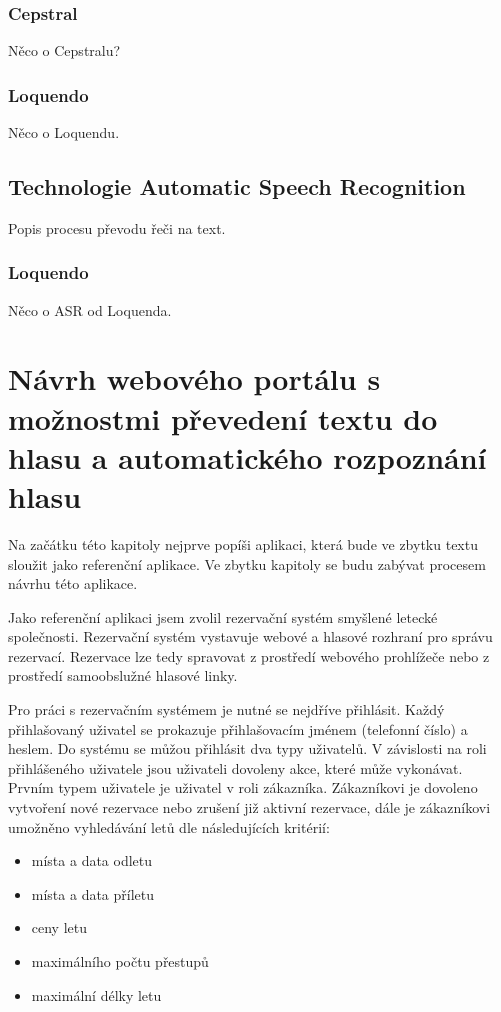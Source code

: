 \documentclass[ing,male,java,dept460]{diploma}						%
\begin{document}
\subsubsection{Cepstral}
Něco o Cepstralu?

\subsubsection{Loquendo}
Něco o Loquendu.

\subsection{Technologie Automatic Speech Recognition}
Popis procesu převodu řeči na text.

\subsubsection{Loquendo}
Něco o ASR od Loquenda.

\section{Návrh webového portálu s možnostmi převedení textu do hlasu a automatického rozpoznání hlasu}
\label{sec:Navrh}
Na začátku této kapitoly nejprve popíši aplikaci, která bude ve zbytku textu sloužit jako referenční aplikace. Ve zbytku kapitoly se budu zabývat procesem návrhu této aplikace.

Jako referenční aplikaci jsem zvolil rezervační systém smyšlené letecké společnosti. Rezervační systém vystavuje webové a hlasové rozhraní pro správu rezervací. Rezervace lze tedy spravovat z prostředí webového prohlížeče nebo z prostředí samoobslužné hlasové linky.

Pro práci s rezervačním systémem je nutné se nejdříve přihlásit. Každý přihlašovaný uživatel se prokazuje přihlašovacím jménem (telefonní číslo) a heslem. Do systému se můžou přihlásit dva typy uživatelů. V závislosti na roli přihlášeného uživatele jsou uživateli dovoleny akce, které může vykonávat. Prvním typem uživatele je uživatel v roli zákazníka. Zákazníkovi je dovoleno vytvoření nové rezervace nebo zrušení již aktivní rezervace, dále je zákazníkovi umožněno vyhledávání letů dle následujících kritérií:

\begin{itemize}
\item místa a data odletu
\item místa a data příletu
\item ceny letu
\item maximálního počtu přestupů
\item maximální délky letu
\end{itemize}
\end{document}
